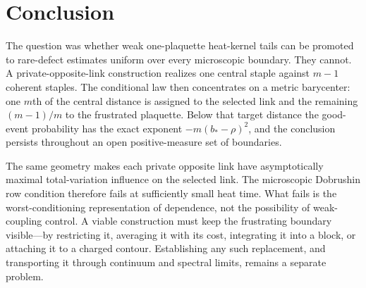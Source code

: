 \section{Conclusion}

The question was whether weak one-plaquette heat-kernel tails can be promoted
to rare-defect estimates uniform over every microscopic boundary.  They
cannot.  A private-opposite-link construction realizes one central staple
against $m-1$ coherent staples.  The conditional law then concentrates on a
metric barycenter: one $m$th of the central distance is assigned to the
selected link and the remaining $(m-1)/m$ to the frustrated plaquette.  Below
that target distance the good-event probability has the exact exponent
$-m(b_*-\rho)^2$, and the conclusion persists throughout an open
positive-measure set of boundaries.

The same geometry makes each private opposite link have asymptotically
maximal total-variation influence on the selected link.  The microscopic
Dobrushin row condition therefore fails at sufficiently small heat time.
What fails is the worst-conditioning representation of dependence, not the
possibility of weak-coupling control.  A viable construction must keep the
frustrating boundary visible---by restricting it, averaging it with its
cost, integrating it into a block, or attaching it to a charged contour.
Establishing any such replacement, and transporting it through continuum and
spectral limits, remains a separate problem.
